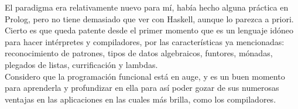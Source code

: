 El paradigma era relativamente nuevo para m\'i, hab\'ia hecho alguna pr\'actica en Prolog, pero no tiene demasiado que ver con Haskell, aunque lo parezca a priori. Cierto es que queda patente desde el primer momento que es un lenguaje id\'oneo para hacer int\'erpretes y compiladores, por las caracter\'isticas ya mencionadas: reconocimiento de patrones, tipos de datos algebraicos, funtores, m\'onadas, plegados de listas, currificaci\'on y lambdas.\\

Considero que la programaci\'on funcional est\'a en auge, y es un buen momento para aprenderla y profundizar en ella para as\'i poder gozar de sus numerosas ventajas en las aplicaciones en las cuales m\'as brilla, como los compiladores.